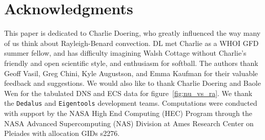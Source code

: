 \documentclass[reprint,amsmath,amssymb,aps,nofootinbib]{revtex4-1}
\newcommand\Ra{\mathrm{Ra}}
\newcommand\Nu{\mathrm{Nu}}
\newcommand{\eq}[1]{(\ref{#1})}
\begin{document}

\section*{Acknowledgments}
This paper is dedicated to Charlie Doering, who greatly influenced the way many of us think about Rayleigh-Benard convection.
DL met Charlie as a WHOI GFD summer fellow, and has difficulty imagining Walsh Cottage without Charlie's friendly and open scientific style, and enthusiasm for softball.
The authors thank Geoff Vasil, Greg Chini, Kyle Augustson, and Emma Kaufman for their valuable feedback and suggestions.
We would also like to thank Charlie Doering and Baole Wen for the tabulated DNS and ECS data for figure~\ref{fig:nu_vs_ra}.
We thank the \texttt{Dedalus} and \texttt{Eigentools} development teams. 
Computations were conducted with support by the NASA High End Computing (HEC) Program through the NASA Advanced Supercomputing (NAS) Division at Ames Research Center on Pleiades with allocation GIDs s2276.

\appendix
\end{document}
